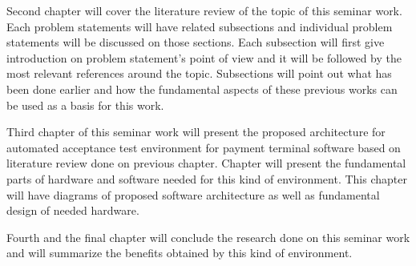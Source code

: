 Second chapter will cover the literature review of the topic of this seminar work. Each problem statements will have related subsections and individual problem statements will be discussed on those sections. Each subsection will first give introduction on problem statement's point of view and it will be followed by the most relevant references around the topic. Subsections will point out what has been done earlier and how the fundamental aspects of these previous works can be used as a basis for this work.

Third chapter of this seminar work will present the proposed architecture for automated acceptance test environment for payment terminal software based on literature review done on previous chapter. Chapter will present the fundamental parts of hardware and software needed for this kind of environment. This chapter will have diagrams of proposed software architecture as well as fundamental design of needed hardware.

Fourth and the final chapter will conclude the research done on this seminar work and will summarize the benefits obtained by this kind of environment.

